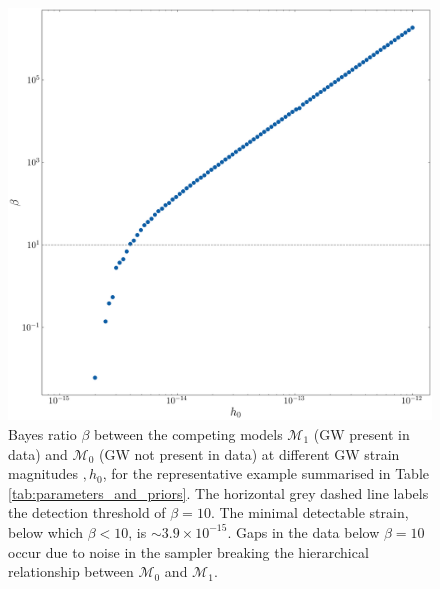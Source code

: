\documentclass[fleqn,usenatbib,useAMS]{mnras}
\begin{document}
\begin{figure}
	\includegraphics[width=\columnwidth]{images/CanonicalBayesPlot2000}
	\caption{Bayes ratio $\beta$ between the competing models $\mathcal{M}_1$ (GW present in data) and $\mathcal{M}_0$ (GW not present in data) at different GW strain magnitudes $,h_0$, for the representative example summarised in Table \ref{tab:parameters_and_priors}. The horizontal grey dashed line labels the detection threshold of $\beta = 10$. The minimal detectable strain, below which $\beta < 10$, is $\sim 3.9 \times 10^{-15}$. Gaps in the data below $\beta=10$ occur due to noise in the sampler breaking the hierarchical relationship between $\mathcal{M}_0$ and $\mathcal{M}_1$.}
	\label{fig:bayes}
\end{figure}
\end{document}
